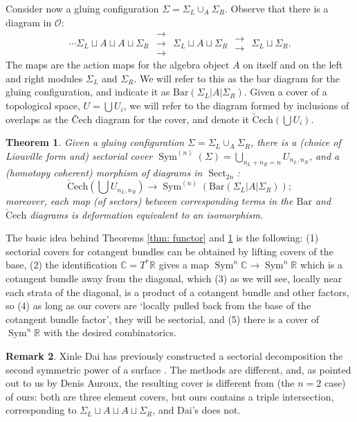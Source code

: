 \documentclass{article}
\def\R{\mathbb{R}}
\def\C{\mathbb{C}}
\DeclareMathOperator{\Sect}{Sect}
\DeclareMathOperator{\Sym}{Sym}
\newtheorem{theorem}{Theorem}[section]
\theoremstyle{definition}
\newtheorem{remark}[theorem]{Remark}
\begin{document}
Consider now a gluing configuration $\Sigma= \Sigma_L \cup_A \Sigma_R$.  Observe that there is a diagram in $\mathscr{O}$: 
\begin{equation} \label{bar diagram} \cdots \Sigma_L \sqcup A \sqcup A \sqcup \Sigma_R \,\, \substack{\rightarrow\\[-.6ex] \rightarrow \\[-.6ex] \rightarrow}   \,\, \Sigma_L \sqcup A \sqcup \Sigma_R \,\, \substack{\rightarrow\\[-.6ex] \rightarrow } \,\, \Sigma_L \sqcup \Sigma_R. \end{equation}
The maps are the action maps for the algebra object $A$ on itself and on the left and right modules $\Sigma_L$ and $\Sigma_R$.  
We will refer to this as the bar diagram for the gluing configuration, and indicate it as $\mathrm{Bar}(\Sigma_L|A|\Sigma_R)$. 
Given a cover of a topological space, $U = \bigcup U_i$, we will refer to the diagram formed by inclusions of overlaps as the \v{C}ech diagram for the cover, and denote it $\mathrm{\check{C}ech}(\bigcup U_i)$. 





\begin{theorem} \label{thm: intro cover}
    Given a gluing configuration $\Sigma= \Sigma_L \cup_A \Sigma_R$, there is a (choice of Liouville form and) sectorial cover $\Sym^{(n)}(\Sigma) = \bigcup_{n_L + n_R =n} U_{n_L, n_R}$, and a (homotopy coherent) morphism of diagrams in $\Sect_{2n}$:
    $$\mathrm{\check{C}ech}(\bigcup U_{n_L, n_R}) \to \Sym^{(n)}(\mathrm{Bar}(\Sigma_L|A| \Sigma_R));$$
    moreover, each map (of sectors) between corresponding terms in the $\mathrm{Bar}$ and $\mathrm{\check{C}ech}$ diagrams is  deformation equivalent to an isomorphism. 
\end{theorem}

The basic idea behind Theorems \ref{thm: functor} and \ref{thm: intro cover}  is the following: (1) sectorial covers for cotangent bundles can be obtained  by lifting covers of the base, (2) the identification $\C = T^*\R$ gives a map $\Sym^n \C \to \Sym^n \R$ which is a cotangent bundle away from the diagonal, which (3) as we will see, locally near each strata of the diagonal, is a product of a cotangent bundle and other factors, so (4) as long as our covers are `locally pulled back from the base of the cotangent bundle factor', they will be sectorial, and (5) there is a cover of $\Sym^n \R$ with the desired combinatorics.   

\begin{remark}    Xinle Dai has previously constructed a sectorial decomposition the second symmetric power of a surface \cite{Dai-sectorial}.  
The methods are  different, and, as pointed out to us by Denis Auroux, the resulting cover is different from (the $n=2$ case) of ours: both are three element covers, but ours contains a triple intersection, corresponding to $\Sigma_L \sqcup A \sqcup A \sqcup \Sigma_R$, and Dai's does not.  
\end{remark}
\end{document}
